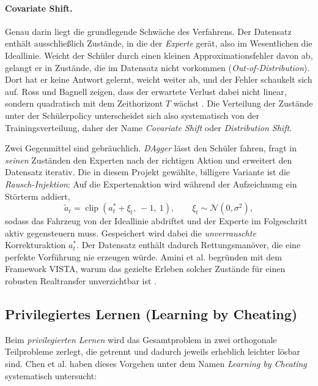 \paragraph{Covariate Shift.}
Genau darin liegt die grundlegende Schwäche des Verfahrens. Der Datensatz enthält ausschließlich Zustände, in die der \emph{Experte} gerät, also im Wesentlichen die Ideallinie. Weicht der Schüler durch einen kleinen Approximationsfehler davon ab, gelangt er in Zustände, die im Datensatz nicht vorkommen (\emph{Out-of-Distribution}). Dort hat er keine Antwort gelernt, weicht weiter ab, und der Fehler schaukelt sich auf. Ross und Bagnell zeigen, dass der erwartete Verlust dabei nicht linear, sondern quadratisch mit dem Zeithorizont $T$ wächst \cite{ross2011reduction}. Die Verteilung der Zustände unter der Schülerpolicy unterscheidet sich also systematisch von der Trainingsverteilung, daher der Name \emph{Covariate Shift} oder \emph{Distribution Shift}.

Zwei Gegenmittel sind gebräuchlich. \emph{DAgger} \cite{ross2011reduction} lässt den Schüler fahren, fragt in \emph{seinen} Zuständen den Experten nach der richtigen Aktion und erweitert den Datensatz iterativ. Die in diesem Projekt gewählte, billigere Variante ist die \emph{Rausch-Injektion}: Auf die Expertenaktion wird während der Aufzeichnung ein Störterm addiert,
\begin{equation}
  \tilde{a}_t = \operatorname{clip}\left( a_t^{*} + \xi_t,\ -1,\ 1 \right), \qquad \xi_t \sim \mathcal{N}(0, \sigma^2),
  \label{eq:noise}
\end{equation}
sodass das Fahrzeug von der Ideallinie abdriftet und der Experte im Folgeschritt aktiv gegensteuern muss. Gespeichert wird dabei die \emph{unverrauschte} Korrekturaktion $a^{*}_t$. Der Datensatz enthält dadurch Rettungsmanöver, die eine perfekte Vorführung nie erzeugen würde. Amini et al. begründen mit dem Framework VISTA, warum das gezielte Erleben solcher Zustände für einen robusten Realtransfer unverzichtbar ist \cite{amini2020learning}.

\subsection{Privilegiertes Lernen (Learning by Cheating)}
\label{subsec:privileged}

Beim \emph{privilegierten Lernen} wird das Gesamtproblem in zwei orthogonale Teilprobleme zerlegt, die getrennt und dadurch jeweils erheblich leichter lösbar sind. Chen et al. haben dieses Vorgehen unter dem Namen \textit{Learning by Cheating} \cite{chen2019learning} systematisch untersucht:

